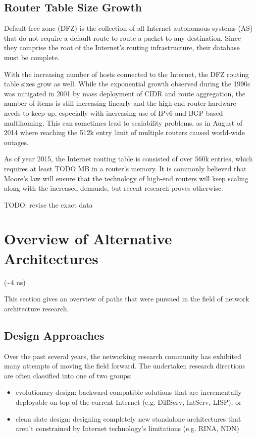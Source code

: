     \section{Router Table Size Growth}
        Default-free zone (DFZ) is the collection of all Internet autonomous systems (AS) that do not require a default route to route a packet to any destination. Since they comprise the root of the Internet's routing infrastructure, their database must be complete.

        With the increasing number of hosts connected to the Internet, the DFZ routing table sizes grow as well. While the exponential growth observed during the 1990s was mitigated in 2001 by mass deployment of CIDR and route aggregation, the number of items is still increasing linearly and the high-end router hardware needs to keep up, especially with increasing use of IPv6 and BGP-based multihoming. This can sometimes lead to scalability problems, as in August of 2014 where reaching the 512k entry limit of multiple routers caused world-wide outages.

        As of year 2015, the Internet routing table is consisted of over 560k entries, which requires at least TODO MB in a router's memory. It is commonly believed that Moore's law will ensure that the technology of high-end routers will keep scaling along with the increased demands, but recent research proves otherwise.

        TODO: revise the exact data


\chapter{Overview of Alternative Architectures}
    (\textasciitilde4 ns)

    This section gives an overview of paths that were pursued in the field of network architecture research.

    \section{Design Approaches}

        Over the past several years, the networking research community has exhibited many attempts of moving the field forward. The undertaken research directions are often classified into one of two groups:

        \begin{itemize}
            \item evolutionary design: backward-compatible solutions that are incrementally deployable on top of the current Internet (e.g. DiffServ, IntServ, LISP), or
            \item clean slate design: designing completely new standalone architectures that aren't constrained by Internet technology's limitations (e.g. RINA, NDN)
        \end{itemize}

